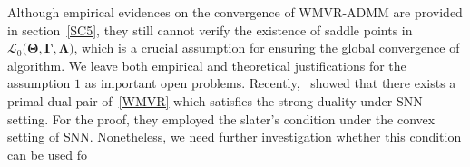 \documentclass[12pt]{article}
\begin{document}
Although empirical evidences on the convergence of WMVR-ADMM are provided in section~\ref{SC5}, they still cannot verify the existence of saddle points in $\mathcal{L}_{0}\big(\boldsymbol{\Theta},\boldsymbol{\Gamma},\boldsymbol{\Lambda}\big)$, which is a crucial assumption for ensuring the global convergence of algorithm.
We leave both empirical and theoretical justifications for the assumption $1$ as important open problems. 
Recently,~\citet{shang2021regularization} showed that there exists a primal-dual pair of~\eqref{WMVR} which satisfies the strong duality under SNN setting.
For the proof, they employed the slater's condition under the convex setting of SNN.
Nonetheless, we need further investigation whether this condition can be used fo

\newpage


\end{document}
